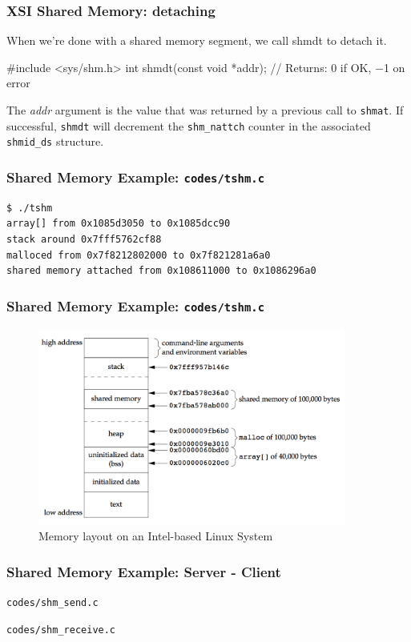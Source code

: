 \documentclass[newPxFont,sthlmFooter,nooffset]{beamer}
\begin{document}
\begin{frame}[t, fragile]
  \frametitle{XSI Shared Memory: detaching}
When we’re done with a shared memory segment, we call shmdt to detach it.
\begin{codedef}
#include <sys/shm.h>
int shmdt(const void *addr);
// Returns: 0 if OK, −1 on error
\end{codedef}
The \textit{addr} argument is the value that was returned by a previous call to \texttt{shmat}. If successful, \texttt{shmdt} will decrement the \texttt{shm\_nattch} counter in the associated \texttt{shmid\_ds} structure.
\end{frame}



\begin{frame}
  \frametitle{Shared Memory Example: \texttt{codes/tshm.c}}

\begin{verbatim}
$ ./tshm
array[] from 0x1085d3050 to 0x1085dcc90
stack around 0x7fff5762cf88
malloced from 0x7f8212802000 to 0x7f821281a6a0
shared memory attached from 0x108611000 to 0x1086296a0
\end{verbatim}
\end{frame}



\begin{frame}[t]
  \frametitle{Shared Memory Example: \texttt{codes/tshm.c}}
  \begin{figure}[h]
    \centering
    \includegraphics[width=0.9\textwidth]{figures/fig15_32-memory.png}
    \caption{Memory layout on an Intel-based Linux System}
  \end{figure}
\end{frame}



\begin{frame}
  \frametitle{Shared Memory Example: Server - Client}
\texttt{codes/shm\_send.c}


\newpage
\texttt{codes/shm\_receive.c}

\end{frame}
\end{document}

